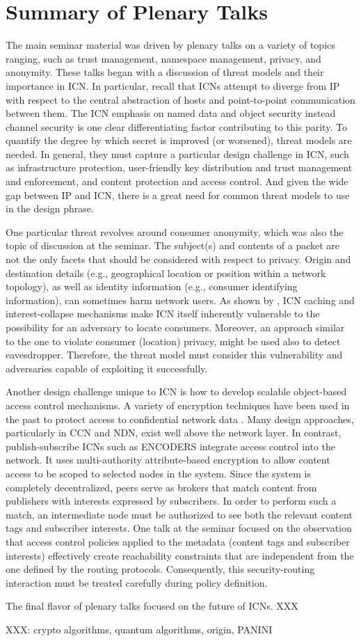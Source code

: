 \section{Summary of Plenary Talks} \label{sec:plenary-talks}
The main seminar material was driven by plenary talks on a variety of topics
ranging, such as trust management, namespace management, privacy, and anonymity.
These talks began with a discussion of threat models and their importance in ICN.
In particular, recall that ICNs attempt to diverge from IP with respect
to the central abstraction of hosts and point-to-point communication between
them. The ICN emphasis on named data and object security instead channel security
is one clear differentiating factor contributing to this parity. To quantify
the degree by which secret is improved (or worsened), threat models are needed.
In general, they must capture a particular design challenge in ICN, such as
infrastructure protection, user-friendly key distribution and trust management
and enforcement, and content protection and access control. And given the wide gap
between IP and ICN, there is a great need for common threat models to use
in the design phrase.

One particular threat revolves around consumer anonymity, which was also
the topic of discussion at the seminar. The subject(s) and contents
of a packet are not the only facets that should be considered with respect to privacy.
Origin and destination details (e.g., geographical location or position within a network
topology), as well as identity information (e.g., consumer identifying information),
can sometimes harm network users. As shown by \cite{}, ICN caching and interest-collapse mechanisms make
ICN itself inherently vulnerable to the possibility for an adversary to locate
consumers. Moreover, an approach similar to the one to violate consumer
(location) privacy, might be used also to detect eavesdropper. Therefore, the
threat model must consider this vulnerability and adversaries capable of exploiting
it successfully.

Another design challenge unique to ICN is how to develop scalable object-based
access control mechanisms. A variety of encryption techniques have been used
in the past to protect access to confidential network data \cite{references}.
Many design approaches, particularly in CCN and NDN, exist well above the network
layer. In contrast, publish-subscribe ICNs such as ENCODERS \cite{} integrate
access control into the network. It uses multi-authority attribute-based encryption
to allow content access to be scoped to selected nodes in the system. Since the
system is completely decentralized, peers serve as brokers that match content from
publishers with interests expressed by subscribers. In order to perform such a match,
an intermediate node must be authorized to see both the relevant content tags and
subscriber interests. One talk at the seminar focused on the observation that
access control policies applied to the metadata (content tags and subscriber interests)
effectively create reachability constraints that are independent from the one defined by
the routing protocols. Consequently, this security-routing interaction must be
treated carefully during policy definition.

The final flavor of plenary talks focused on the future of ICNs. XXX

XXX: crypto algorithms, quantum algorithms, origin, PANINI
